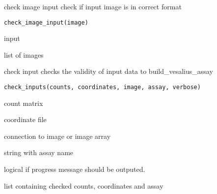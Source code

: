 \documentclass[a4paper]{book}
\begin{document}
%
\begin{Description}
check image input 
check if input image is in correct format
\end{Description}
%
\begin{Usage}
\begin{verbatim}
check_image_input(image)
\end{verbatim}
\end{Usage}
%
\begin{Arguments}
\begin{ldescription}
\item[\code{image}] input
\end{ldescription}
\end{Arguments}
%
\begin{Value}
list of images
\end{Value}
%
\begin{Description}
check input checks the validity of input data to build\_vesalius\_assay
\end{Description}
%
\begin{Usage}
\begin{verbatim}
check_inputs(counts, coordinates, image, assay, verbose)
\end{verbatim}
\end{Usage}
%
\begin{Arguments}
\begin{ldescription}
\item[\code{counts}] count matrix

\item[\code{coordinates}] coordinate file

\item[\code{image}] connection to image or image array

\item[\code{assay}] string with assay name

\item[\code{verbose}] logical if progress message should be outputed.
\end{ldescription}
\end{Arguments}
%
\begin{Value}
list containing checked counts, coordinates and assay
\end{Value}
\end{document}
